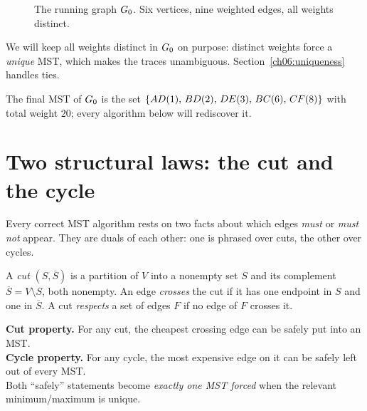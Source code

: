\begin{figure}[H]
\centering
{}
\caption{The running graph $G_0$. Six vertices, nine weighted edges, all weights distinct.}
\label{ch06:running-graph}
\end{figure}

We will keep all weights distinct in $G_0$ on purpose: distinct weights force a \emph{unique} MST, which makes the traces unambiguous. Section~\ref{ch06:uniqueness} handles ties.

The final MST of $G_0$ is the set $\{AD(1),\,BD(2),\,DE(3),\,BC(6),\,CF(8)\}$ with total weight $20$; every algorithm below will rediscover it.

\section{Two structural laws: the cut and the cycle}

Every correct MST algorithm rests on two facts about which edges \emph{must} or \emph{must not} appear. They are duals of each other: one is phrased over cuts, the other over cycles.

\begin{definition}[Cut]
A \emph{cut} $(S,\overline S)$ is a partition of $V$ into a nonempty set $S$ and its complement $\overline S=V\setminus S$, both nonempty. An edge \emph{crosses} the cut if it has one endpoint in $S$ and one in $\overline S$. A cut \emph{respects} a set of edges $F$ if no edge of $F$ crosses it.
\end{definition}

\begin{focusbox}
\textbf{Cut property.} For any cut, the cheapest crossing edge can be safely put into an MST. \\
\textbf{Cycle property.} For any cycle, the most expensive edge on it can be safely left out of every MST. \\
Both ``safely'' statements become \emph{exactly one MST forced} when the relevant minimum/maximum is unique.
\end{focusbox}

